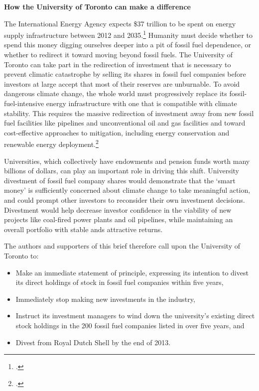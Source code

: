 \textbf{How the University of Toronto can make a difference}



The International Energy Agency expects \$37 trillion to be spent on energy supply infrastructure between 2012 and 2035.\footcite[][]{IEA2012factsheet}
Humanity must decide whether to spend this money digging ourselves deeper into a pit of fossil fuel dependence, or whether to redirect it toward moving beyond fossil fuels.
The University of Toronto can take part in the redirection of investment that is necessary to prevent climatic catastrophe by selling its shares in fossil fuel companies before investors at large accept that most of their reserves are unburnable.
To avoid dangerous climate change, the whole world must progressively replace its fossil-fuel-intensive energy infrastructure with one that is compatible with climate stability.
This requires the massive redirection of investment away from new fossil fuel facilities like pipelines and unconventional oil and gas facilities and toward cost-effective approaches to  mitigation, including energy conservation and renewable energy deployment.\footcite[The consultancy McKinsey \& Company has studied and ranked global mitigation options, in terms of their cost, plausible deployment speed, and their capacity to mitigate greenhouse gas pollution. See: ][p. 8]{McKinseyCurve}



Universities, which collectively have endowments and pension funds worth many billions of dollars, can play an important role in driving this shift.
University divestment of fossil fuel company shares would demonstrate that the `smart money' is sufficiently concerned about climate change to take meaningful action, and could prompt other investors to reconsider their own investment decisions. 
Divestment would help decrease investor confidence in the viability of new projects like coal-fired power plants and oil pipelines, while maintaining an overall portfolio with stable ands attractive returns.



The authors and supporters of this brief therefore call upon the University of Toronto to:
\begin{itemize}
	\item Make an immediate statement of principle, expressing its intention to divest its direct holdings of stock in fossil fuel companies within five years,
	\item Immediately stop making new investments in the industry,
	\item Instruct its investment managers to wind down the university’s existing direct stock holdings in the 200 fossil fuel companies listed in  over five years, and
	\item Divest from Royal Dutch Shell by the end of 2013.
\end{itemize}



